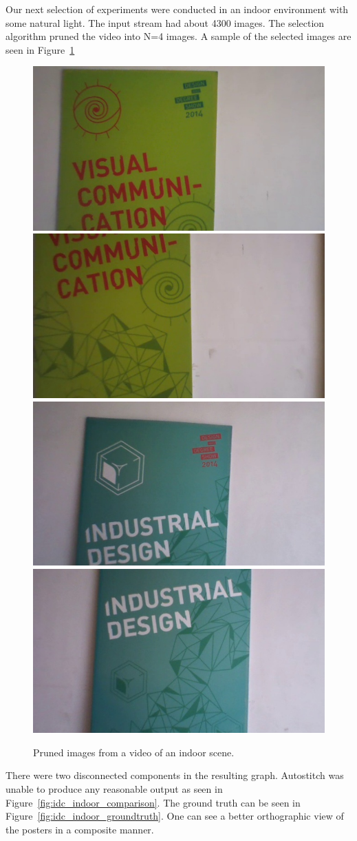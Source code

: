 Our next selection of experiments were conducted in an indoor
environment with some natural light.  The input stream had about 4300
images. The selection algorithm pruned the video into N=4 images. A
sample of the selected images are seen in Figure~\ref{fig:idc_selected}

\begin{figure}
\centering
\includegraphics[width=0.22\linewidth]{figures/idc_indoor/selected/1.jpg}
\includegraphics[width=0.22\linewidth]{figures/idc_indoor/selected/2.jpg}
\includegraphics[width=0.22\linewidth]{figures/idc_indoor/selected/3.jpg}
\includegraphics[width=0.22\linewidth]{figures/idc_indoor/selected/4.jpg}
\caption{Pruned images from a video of an indoor scene.}
\label{fig:idc_selected}
\end{figure}

There were two disconnected components in the resulting graph.
Autostitch was unable to produce any reasonable output as seen in
Figure~\ref{fig:idc_indoor_comparison}.  The ground truth can be seen
in Figure~\ref{fig:idc_indoor_groundtruth}.  One can see a better
orthographic view of the posters in a composite manner.


